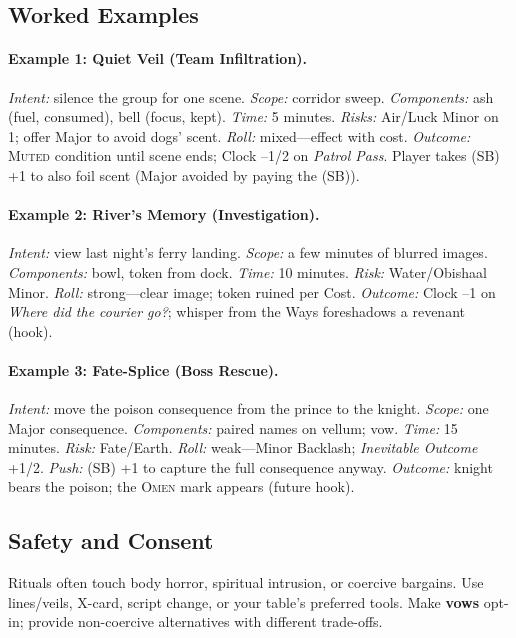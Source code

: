 \subsection{Worked Examples}\label{subsec:ritual-examples}
\paragraph{Example 1: Quiet Veil (Team Infiltration).}
\emph{Intent:} silence the group for one scene. \emph{Scope:} corridor sweep. \emph{Components:} ash (fuel, consumed), bell (focus, kept). \emph{Time:} 5 minutes. \emph{Risks:} Air/Luck Minor on 1; offer Major to avoid dogs' scent. \emph{Roll:} mixed—effect with cost. \emph{Outcome:} \textsc{Muted} condition until scene ends; Clock –1/2 on \emph{Patrol Pass}. Player takes (SB) +1 to also foil scent (Major avoided by paying the (SB)).

\paragraph{Example 2: River's Memory (Investigation).}
\emph{Intent:} view last night's ferry landing. \emph{Scope:} a few minutes of blurred images. \emph{Components:} bowl, token from dock. \emph{Time:} 10 minutes. \emph{Risk:} Water/Obishaal Minor. \emph{Roll:} strong—clear image; token ruined per Cost. \emph{Outcome:} Clock –1 on \emph{Where did the courier go?}; whisper from the Ways foreshadows a revenant (hook).

\paragraph{Example 3: Fate-Splice (Boss Rescue).}
\emph{Intent:} move the poison consequence from the prince to the knight. \emph{Scope:} one Major consequence. \emph{Components:} paired names on vellum; vow. \emph{Time:} 15 minutes. \emph{Risk:} Fate/Earth. \emph{Roll:} weak—Minor Backlash; \emph{Inevitable Outcome} +1/2. \emph{Push:} (SB) +1 to capture the full consequence anyway. \emph{Outcome:} knight bears the poison; the \textsc{Omen} mark appears (future hook).

\subsection{Safety and Consent}\label{subsec:ritual-safety}
Rituals often touch body horror, spiritual intrusion, or coercive bargains. Use lines/veils, X-card, script change, or your table's preferred tools. Make \textbf{vows} opt-in; provide non-coercive alternatives with different trade-offs.

